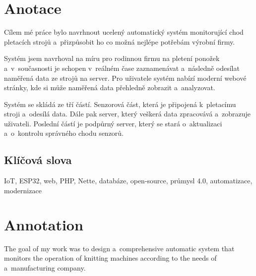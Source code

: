 \documentclass{template/socthesis}
\author{Jakub Andrýsek} %
\begin{document}

\maketitle %



\pagestyle{empty}

\section*{Anotace}
Cílem mé práce bylo navrhnout ucelený automatický systém monitorující chod pletacích strojů a~přizpůsobit ho co možná nejlépe potřebám výrobní firmy.

Systém jsem navrhoval na míru pro rodinnou firmu na pletení ponožek a~v sou\-čas\-nos\-ti je schopen v~reálném čase zaznamenávat a~následně odesílat naměřená data ze strojů na server. 
Pro uživatele systém nabízí moderní webové stránky, kde si může naměřená data přehledně zobrazit a~analyzovat.

Systém se skládá ze tří částí. Senzorová část, která je připojená k~pletacímu stroji a~odesílá data.
Dále pak server, který veškerá data zpracovává a~zobrazuje uživateli.
Poslední částí je podpůrný server, který se stará o~aktualizaci a~o~kontrolu správného chodu senzorů.

\subsection*{Klíčová slova}
IoT, ESP32, web, PHP, Nette, databáze, open-source, průmysl 4.0, automatizace, modernizace


\newpage %

\vspace{20mm}

\section*{Annotation}
The goal of my work was to design a~comprehensive automatic system that monitors the operation of knitting machines according to the needs of a~manufacturing company.
\end{document}
